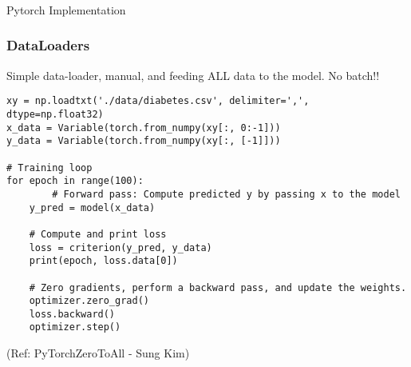 





\begin{frame}[fragile]\frametitle{}

\begin{center}
{\Large Pytorch Implementation}
\end{center}
\end{frame}


\begin{frame}[fragile] \frametitle{DataLoaders}
Simple data-loader, manual, and feeding ALL data to the model. No batch!!
\begin{lstlisting}
xy = np.loadtxt('./data/diabetes.csv', delimiter=',', dtype=np.float32)
x_data = Variable(torch.from_numpy(xy[:, 0:-1]))
y_data = Variable(torch.from_numpy(xy[:, [-1]]))

# Training loop
for epoch in range(100):
        # Forward pass: Compute predicted y by passing x to the model
    y_pred = model(x_data)

    # Compute and print loss
    loss = criterion(y_pred, y_data)
    print(epoch, loss.data[0])

    # Zero gradients, perform a backward pass, and update the weights.
    optimizer.zero_grad()
    loss.backward()
    optimizer.step()
\end{lstlisting}

\tiny{(Ref: PyTorchZeroToAll  - Sung Kim)}
\end{frame}

